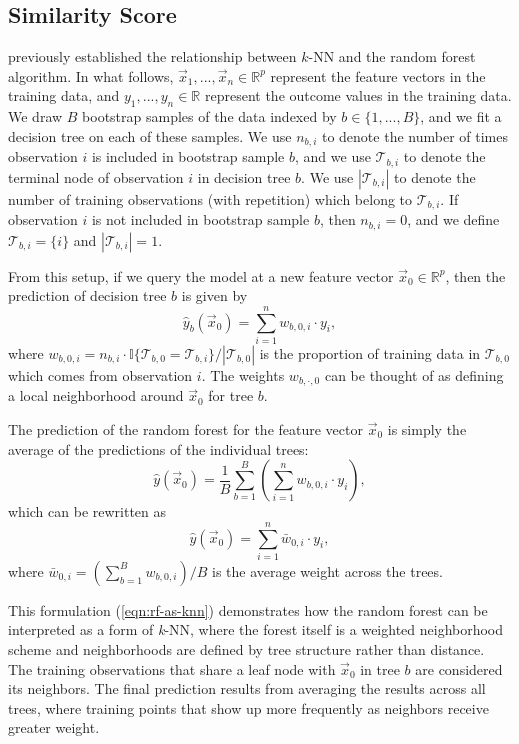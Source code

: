 \documentclass[Review, sageh, times]{sagej}
\begin{document}
\subsection{Similarity Score}
\textcite{lin_random_2006} previously established the relationship between $k$-NN and the random forest algorithm. In what follows, $\vec x_1, ..., \vec x_n \in \mathbb{R}^p$ represent the feature vectors in the training data, and $y_1, ..., y_n \in \mathbb{R}$ represent the outcome values in the training data. We draw $B$ bootstrap samples of the data indexed by $b \in \{1, ..., B\}$, and we fit a decision tree on each of these samples. We use $n_{b,i}$ to denote the number of times observation $i$ is included in bootstrap sample $b$, and we use $\mathcal{T}_{b,i}$ to denote the terminal node of observation $i$ in decision tree $b$. We use $|\mathcal{T}_{b,i}|$ to denote the number of training observations (with repetition) which belong to $\mathcal{T}_{b,i}$. If observation $i$ is not included in bootstrap sample $b$, then $n_{b,i} = 0$, and we define $\mathcal{T}_{b,i} = \{i\}$ and $|\mathcal{T}_{b,i}| = 1$.

From this setup, if we query the model at a new feature vector $\vec x_0 \in \mathbb{R}^p$, then the prediction of decision tree $b$ is given by
$$
  \hat{y}_b(\vec x_0) = \sum_{i = 1}^{n} w_{b,0,i} \cdot y_i,
$$
where $w_{b,0,i} = n_{b,i} \cdot \mathbb{I}\{\mathcal{T}_{b,0} = \mathcal{T}_{b,i}\} / |\mathcal{T}_{b,0}|$ is the proportion of training data in $\mathcal{T}_{b,0}$ which comes from observation $i$. The weights $w_{b,\cdot,0}$ can be thought of as defining a local neighborhood around $\vec x_0$ for tree $b$.

The prediction of the random forest for the feature vector $\vec x_0$ is simply the average of the predictions of the individual trees:
\begin{equation*}
  \hat{y}(\vec x_0) = \frac{1}{B} \sum_{b = 1}^B \left(\sum_{i = 1}^{n} w_{b,0,i} \cdot y_i\right),
\end{equation*}
which can be rewritten as
\begin{equation}
  \label{eqn:rf-as-knn}
  \hat{y}(\vec x_0) = \sum_{i = 1}^n \bar w_{0,i} \cdot y_i,
\end{equation}
where $\bar w_{0,i} = \left(\sum_{b = 1}^B w_{b,0,i}\right) / B$ is the average weight across the trees.

This formulation (\ref{eqn:rf-as-knn}) demonstrates how the random forest can be interpreted as a form of \textit{k}-NN, where the forest itself is a weighted neighborhood scheme and neighborhoods are defined by tree structure rather than distance. The training observations that share a leaf node with $\vec x_0$ in tree $b$ are considered its neighbors. The final prediction results from averaging the results across all trees, where training points that show up more frequently as neighbors receive greater weight.
\end{document}
